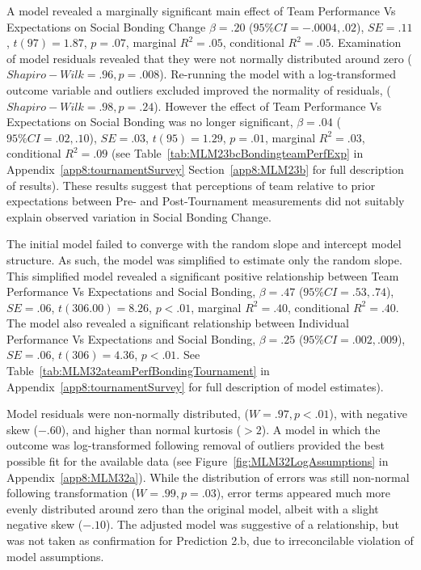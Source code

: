\begin{CJK}{UTF8}{gbsn}
  A model revealed a marginally significant main effect of Team Performance Vs Expectations on Social Bonding Change $\beta = .20$ ($95\% CI =  -.0004, .02$), $SE = .11$, $t(97) = 1.87$, $p = .07$, marginal $R^2 = .05$, conditional $R^2 = .05$.  Examination of model residuals revealed that they were not normally distributed around zero ($Shapiro-Wilk = .96, p = .008$).  Re-running the model with a log-transformed outcome variable and outliers excluded improved the normality of residuals, ($Shapiro-Wilk = .98, p = .24$).
  However the effect of Team Performance Vs Expectations on Social Bonding was no longer significant, $\beta = .04$ ($95\% CI =  .02, .10$), $SE = .03$, $t(95) = 1.29$, $p = .01$, marginal $R^2 = .03$, conditional $R^2 = .09$ (see Table~\ref{tab:MLM23bcBondingteamPerfExp} in Appendix~\ref{app8:tournamentSurvey} Section~\ref{app8:MLM23b} for full description of results).  These results suggest that perceptions of team relative to prior expectations between Pre- and Post-Tournament measurements did not suitably explain observed variation in Social Bonding Change.



  The initial model failed to converge with the random slope and intercept model structure.  As such, the model was simplified to estimate only the random slope. This simplified model revealed a significant positive relationship between Team Performance Vs Expectations and Social Bonding, $\beta = .47$ ($95\% CI =  .53, .74$), $SE = .06$, $t(306.00) = 8.26$, $p < .01$, marginal $R^2 = .40$, conditional $R^2 = .40$.  The model also revealed a significant relationship between Individual Performance Vs Expectations and Social Bonding, $\beta = .25$ ($95\% CI =  .002, .009$), $SE = .06$, $t(306) = 4.36$, $p < .01$. See Table~\ref{tab:MLM32ateamPerfBondingTournament} in Appendix~\ref{app8:tournamentSurvey} for full description of model estimates).

  Model residuals were non-normally distributed, ($W = .97, p < .01$), with negative skew ($-.60$), and higher than normal kurtosis ($> 2$).  A model in which the outcome was log-transformed following removal of outliers provided the best possible fit for the available data (see Figure~\ref{fig:MLM32LogAssumptions} in Appendix~\ref{app8:MLM32a}).  While the distribution of errors was still non-normal following transformation ($W = .99, p = .03$),  error terms appeared much more evenly distributed around zero than the original model, albeit with a slight negative skew ($-.10$).
  The adjusted model was suggestive of a relationship, but was not taken as confirmation for Prediction 2.b, due to irreconcilable violation of model assumptions.


\end{CJK}
